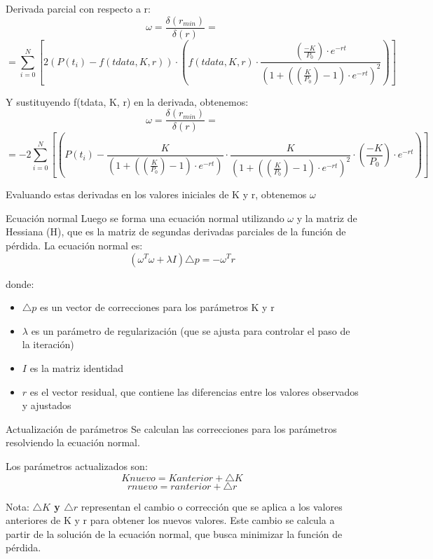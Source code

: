\documentclass{beamer}
\begin{document}
\begin{frame}  
\begin{block}{Derivada parcial con respecto a r:}
$$\omega = \frac{\delta(r_{min})}{\delta(r)} = $$ 
\small{$$=\sum_{i=0}^{N}[2(P(t_{i}) - f(tdata, K, r)) \cdot (f(tdata, K, r) \cdot \frac{(\frac{-K}{P_{0}}) \cdot e^{-rt}}{(1 + ((\frac{K}{P_{0}}) - 1) \cdot e^{-rt})^{2}})]$$}
\end{block}
\begin{block}{Y sustituyendo  f(tdata, K, r) en la derivada, obtenemos:}
$$\omega = \frac{\delta(r_{min})}{\delta(r)} = $$
\small{$$= -2\sum_{i=0}^{N}[(P(t_{i}) - \frac{K}{(1 + ((\frac{K}{P_{0}}) - 1) \cdot e^{-rt})} \cdot \frac{K}{(1 + ((\frac{K}{P_{0}}) - 1) \cdot e^{-rt})^{2}} \cdot (\frac{-K}{P_{0}}) \cdot e^{-rt})]$$}
\end{block}
Evaluando estas derivadas en los valores iniciales de K y r, obtenemos $\omega$
\end{frame}

\begin{frame}{Ecuación normal}
    Luego se forma una ecuación normal utilizando $\omega$ y la matriz de Hessiana (H), que es la matriz de segundas derivadas parciales de la función de pérdida. La ecuación normal es:
    $$(\omega^{T}\omega + \lambda I)\triangle p = -\omega^{T} r$$
    \begin{block}{donde:}
        \begin{itemize}
            \item $\triangle p$ es un vector de correcciones para los parámetros K y r
            \item $\lambda$ es un parámetro de regularización (que se ajusta para controlar el paso de la iteración)
            \item $I$ es la matriz identidad
            \item $r$ es el vector residual, que contiene las diferencias entre los valores observados y ajustados
        \end{itemize}
    \end{block}
\end{frame}

\begin{frame}{Actualización de parámetros}
Se calculan las correcciones para los parámetros resolviendo la ecuación normal. 
\begin{block}{Los parámetros actualizados son:}
$$Knuevo = Kanterior + \triangle K$$
$$rnuevo = ranterior + \triangle r$$
\end{block}
Nota: \textbf{$\triangle K$ y $\triangle r$} representan el cambio o corrección que se aplica a los valores anteriores de K y r para obtener los nuevos valores. Este cambio se calcula a partir de la solución de la ecuación normal, que busca minimizar la función de pérdida.
\end{frame}
\end{document}
